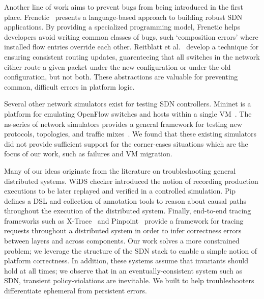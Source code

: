 Another line of work aims to prevent bugs from being introduced in the first
place. Frenetic~\cite{frenetic} presents a language-based approach to building
robust SDN applications. By providing a specialized programming model,
 Frenetic helps developers avoid writing common classes of
bugs, such `composition errors' where installed flow entries override each other.
Reitblatt et al.~\cite{consistentupdates} develop a technique for ensuring
consistent routing updates, guarenteeing that all switches in the network either route
a given packet under the new configuration or under the old configuration,
but not both. These abstractions are valuable for preventing common, difficult errors
in platform logic.

Several other network simulators exist for testing SDN controllers. Mininet is a 
platform for emulating OpenFlow switches and hosts within a single
 VM~\cite{Lantz:2010:NLR:1868447.1868466}. The ns-series of network simulators
provides a general framework for testing new protocols, topologies,
and traffic mixes~\cite{ns3}. We found that these existing simulators did
not provide sufficient support for the corner-cases situations which are the
focus of our work, such as failures and VM migration.

Many of our ideas originate from the literature on troubleshooting general
distributed systems. WiDS checker introduced the notion of recording
production executions to be later replayed and verified in a controlled simulation.
Pip~\cite{pip} defines a DSL and collection of annotation tools to
reason about causal paths throughout the execution of the
distributed system. Finally, end-to-end tracing
frameworks such as X-Trace~\cite{Fonseca:2007:XPN:1973430.1973450} and 
Pinpoint~\cite{Chen02pinpoint:problem} provide a framework for tracing requests throughout 
a distributed system in order to infer correctness errors between layers and
across components. Our work solves a more constrained problem; we leverage
the structure of the SDN stack to enable a simple notion of platform
correctness. In addition, these systems assume that invariants should hold at
all times; we observe that in an eventually-consistent system such as SDN,
transient policy-violations are inevitable. We built \simulator{} to help troubleshooters
differentiate ephemeral from persistent errors. 


